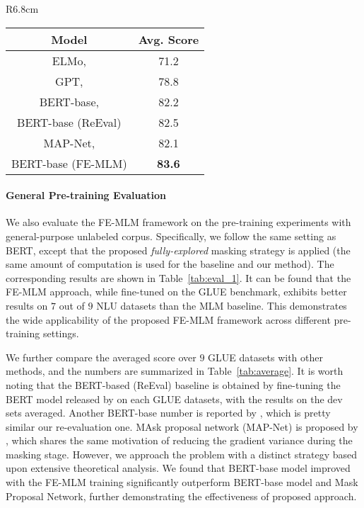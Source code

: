 \documentclass{article} \usepackage{iclr2021_conference,times}
\theoremstyle{plain}
\begin{document}
\begin{wraptable}{R}{6.8cm}
	\vspace{-2mm}
	\setlength{\tabcolsep}{6pt}
	\def\arraystretch{1.0}
	\begin{small}
		\begin{tabular}{c||c}
			\toprule[1.2pt]
			\textbf{Model}  & \textbf{Avg. Score} \\
			\hline
			ELMo, \citep{peters2018deep} & 71.2 \\
			GPT, \citep{radford2018improving} &  78.8 \\
			BERT-base, \citep{devlin2018bert} & 82.2 \\
			BERT-base (ReEval) & 82.5   \\
			MAP-Net, \citep{chen2020variance} & 82.1 \\
			\hline
			BERT-base (FE-MLM) & \textbf{83.6}   \\
			\bottomrule[1.2pt]
		\end{tabular}
	\end{small}
	\caption{The comparison between the FE-MLM model with several baseline methods, based on the averaged score (on the dev set) across different tasks from the GLUE benchmark. }\label{tab:average}
	\vspace{-3mm}
\end{wraptable}
\paragraph{General Pre-training Evaluation} We also evaluate the FE-MLM framework on the pre-training experiments with general-purpose unlabeled corpus. Specifically, we follow the same setting as BERT, except that the proposed \emph{fully-explored} masking strategy is applied (the same amount of computation is used for the baseline and our method). The corresponding results are shown in Table~\ref{tab:eval_1}. 
It can be found that the FE-MLM approach, while fine-tuned on the GLUE benchmark, exhibits better results on $7$ out of $9$ NLU datasets than the MLM baseline. This demonstrates the wide applicability of the proposed FE-MLM framework across different pre-training settings.

We further compare the averaged score over $9$ GLUE datasets with other methods, and the numbers are summarized in Table~\ref{tab:average}. It is worth noting that the BERT-based (ReEval) baseline is obtained by fine-tuning the BERT model released by \cite{devlin2018bert} on each GLUE datasets, with the results on the dev sets averaged. Another BERT-base number is reported by \cite{clark2019electra}, which is pretty similar our re-evaluation one. MAsk proposal network (MAP-Net) is proposed by \cite{chen2020variance}, which shares the same motivation of reducing the gradient variance during the masking stage. However, we approach the problem with a distinct strategy based upon extensive theoretical analysis. We found that BERT-base model improved with the FE-MLM training significantly outperform BERT-base model and Mask Proposal Network, further demonstrating the effectiveness of proposed approach. 
\end{document}

